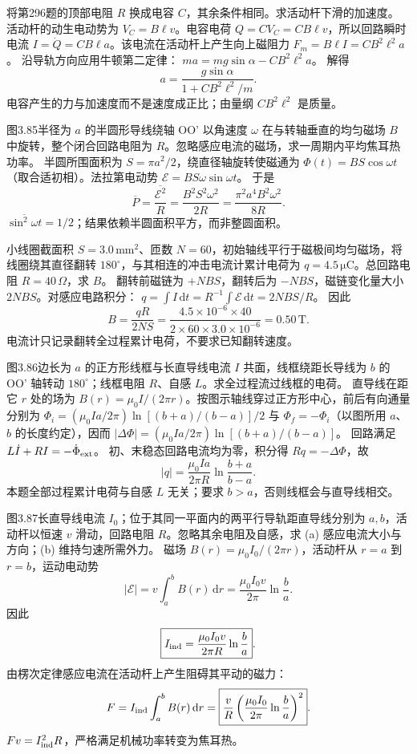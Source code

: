 将第296题的顶部电阻 $R$ 换成电容 $C$，其余条件相同。求活动杆下滑的加速度。
\exsolution
活动杆的动生电动势为
$V_C=B\ell v$。电容电荷
$Q=CV_C=CB\ell v$，所以回路瞬时电流
$I=\dot Q=CB\ell a$。该电流在活动杆上产生向上磁阻力
$F_m=B\ell I=CB^2\ell^2a$。
沿导轨方向应用牛顿第二定律：
$ma=mg\sin\alpha-CB^2\ell^2a$。
解得
\[
\boxed{a=\frac{g\sin\alpha}{1+CB^2\ell^2/m}}.
\]
\excheck 电容产生的力与加速度而不是速度成正比；由量纲 $CB^2\ell^2$ 是质量。

图3.85半径为 $a$ 的半圆形导线绕轴 OO' 以角速度 $\omega$ 在与转轴垂直的均匀磁场 $B$ 中旋转，整个闭合回路电阻为 $R$。忽略感应电流的磁场，求一周期内平均焦耳热功率。
\exsolution
半圆所围面积为 $S=\pi a^2/2$，绕直径轴旋转使磁通为
$\Phi(t)=BS\cos\omega t$（取合适初相）。法拉第电动势
$\mathcal E=BS\omega\sin\omega t$。
于是
\[
\overline P=\frac{\overline{\mathcal E^2}}R
=\frac{B^2S^2\omega^2}{2R}
=\boxed{\frac{\pi^2a^4B^2\omega^2}{8R}}.
\]
\excheck $\overline{\sin^2\omega t}=1/2$；结果依赖半圆面积平方，而非整圆面积。

小线圈截面积 $S=3.0\,\mathrm{mm^2}$、匝数 $N=60$，初始轴线平行于磁极间均匀磁场，将线圈绕其直径翻转 $180^\circ$，与其相连的冲击电流计累计电荷为 $q=4.5\,\mathrm{\mu C}$。总回路电阻 $R=40\,\Omega$，求 $B$。
\exsolution
翻转前磁链为 $+NBS$，翻转后为 $-NBS$，磁链变化量大小 $2NBS$。对感应电路积分：
$q=\int I\,\mathrm dt=R^{-1}\int\mathcal E\,\mathrm dt=2NBS/R$。
因此
\[
\boxed{B=\frac{qR}{2NS}}
=\frac{4.5\times10^{-6}\times40}
{2\times60\times3.0\times10^{-6}}
=\boxed{0.50\,\mathrm T}.
\]
\excheck 电流计只记录翻转全过程累计电荷，不要求已知翻转速度。

图3.86边长为 $a$ 的正方形线框与长直导线电流 $I$ 共面，线框绕距长导线为 $b$ 的 OO' 轴转动 $180^\circ$；线框电阻 $R$、自感 $L$。求全过程流过线框的电荷。
\exsolution
直导线在距它 $r$ 处的场为
$B(r)=\mu_0I/(2\pi r)$。按图示轴线穿过正方形中心，前后有向通量分别为
$\Phi_i=(\mu_0Ia/2\pi)\ln[(b+a)/(b-a)]/2$ 与
$\Phi_f=-\Phi_i$（以图所用 $a$、$b$ 的长度约定），因而
$|\Delta\Phi|=(\mu_0Ia/2\pi)\ln[(b+a)/(b-a)]$。
回路满足
$L\dot I+RI=-\dot\Phi_{\rm ext}$。
初、末稳态回路电流均为零，积分得
$Rq=-\Delta\Phi$，故
\[
\boxed{|q|=\frac{\mu_0Ia}{2\pi R}
\ln\frac{b+a}{b-a}}.
\]
\excheck 本题全部过程累计电荷与自感 $L$ 无关；要求 $b>a$，否则线框会与直导线相交。

图3.87长直导线电流 $I_0$；位于其同一平面内的两平行导轨距直导线分别为 $a,b$，活动杆以恒速 $v$ 滑动，回路电阻 $R$。忽略其余电阻及自感，求 (a) 感应电流大小与方向；(b) 维持匀速所需外力。
\exsolution
磁场 $B(r)=\mu_0I_0/(2\pi r)$，活动杆从 $r=a$ 到 $r=b$，运动电动势
\[
|\mathcal E|=v\int_a^bB(r)\,\mathrm dr
=\frac{\mu_0I_0v}{2\pi}\ln\frac ba.
\]
因此
\[
\boxed{I_{\rm ind}=\frac{\mu_0I_0v}{2\pi R}\ln\frac ba}.
\]
由楞次定律感应电流在活动杆上产生阻碍其平动的磁力：
\[
F=I_{\rm ind}\int_a^bB(r)\,\mathrm dr
=\boxed{\frac vR\left(
\frac{\mu_0I_0}{2\pi}\ln\frac ba
\right)^2}.
\]
\excheck $Fv=I_{\rm ind}^2R$，严格满足机械功率转变为焦耳热。

